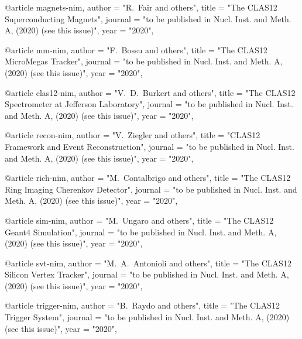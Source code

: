 @article{
magnets-nim,
author         = "R.~Fair and others",
title          = "{The CLAS12 Superconducting Magnets}",
journal        = "to be published in Nucl. Inst. and Meth. A, (2020) (see this issue)",
year           = "2020",
}

@article{
mm-nim,
author         = "F.~Bossu and others",
title          = "{The CLAS12 MicroMegas Tracker}",
journal        = "to be published in Nucl. Inst. and Meth. A, (2020) (see this issue)",
year           = "2020",
}

@article{
clas12-nim,
author         = "V.~D.~Burkert and others",
title          = "{The CLAS12 Spectrometer at Jefferson Laboratory}",
journal        = "to be published in Nucl. Inst. and Meth. A, (2020) (see this issue)",
year           = "2020",
}

@article{
recon-nim,
author         = "V.~Ziegler and others",
title          = "{CLAS12 Framework and Event Reconstruction}",
journal        = "to be published in Nucl. Inst. and Meth. A, (2020) (see this issue)",
year           = "2020",
}

@article{
rich-nim,
author         = "M.~Contalbrigo and others",
title          = "{The CLAS12 Ring Imaging Cherenkov Detector}",
journal        = "to be published in Nucl. Inst. and Meth. A, (2020) (see this issue)",
year           = "2020",
}

@article{
sim-nim,
author         = "M.~Ungaro and others",
title          = "{The CLAS12 Geant4 Simulation}",
journal        = "to be published in Nucl. Inst. and Meth. A, (2020) (see this issue)",
year           = "2020",
}

@article{
svt-nim,
author         = "M.~A.~Antonioli and others",
title          = "{The CLAS12 Silicon Vertex Tracker}",
journal        = "to be published in Nucl. Inst. and Meth. A, (2020) (see this issue)",
year           = "2020",
}

@article{
trigger-nim,
author         = "B.~Raydo and others",
title          = "{The CLAS12 Trigger System}",
journal        = "to be published in Nucl. Inst. and Meth. A, (2020) (see this issue)",
year           = "2020",
}

